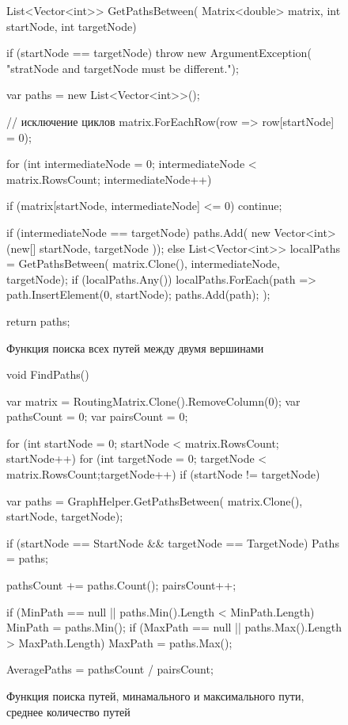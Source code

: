 \documentclass[oneside, final, 14pt, a4paper]{extreport}
\begin{document}
\begin{figure}[h!]
	\begin{listing}{1}
List<Vector<int>> GetPathsBetween(
  Matrix<double> matrix, int startNode, int targetNode)
{
  if (startNode == targetNode)
  throw new ArgumentException(
  "stratNode and targetNode must be different.");

  var paths = new List<Vector<int>>();

  // исключение циклов
  matrix.ForEachRow(row => row[startNode] = 0);

  for (int intermediateNode = 0;
  intermediateNode < matrix.RowsCount; intermediateNode++)
  {
	if (matrix[startNode, intermediateNode] <= 0)
	  continue;

	if (intermediateNode == targetNode)
	  paths.Add(
	  new Vector<int>(new[] { startNode, targetNode }));
	else
	{
	  List<Vector<int>> localPaths = GetPathsBetween(
	  matrix.Clone(), intermediateNode, targetNode);
	  if (localPaths.Any())
		localPaths.ForEach(path =>
	  	{
		  path.InsertElement(0, startNode);
		  paths.Add(path);
	  	});
	  }
    }

  return paths;
}\end{listing}

	\caption{Функция поиска всех путей между двумя вершинами}
	\label{pic:function_getPathsBetween}
\end{figure}

\begin{figure}[h!]
	\begin{listing}{1}
void FindPaths()
{
  var matrix = RoutingMatrix.Clone().RemoveColumn(0);
  var pathsCount = 0;
  var pairsCount = 0;

  for (int startNode = 0; startNode < matrix.RowsCount;
  	startNode++)
	for (int targetNode = 0;
	targetNode < matrix.RowsCount;targetNode++)
	  if (startNode != targetNode)
	  {	
		var paths = GraphHelper.GetPathsBetween(
		  matrix.Clone(), startNode, targetNode);

		if (startNode == StartNode
		  && targetNode == TargetNode)
		    Paths = paths;

		pathsCount += paths.Count();
		pairsCount++;							

		if (MinPath == null
		  || paths.Min().Length < MinPath.Length)
		    MinPath = paths.Min();
		if (MaxPath == null
		  || paths.Max().Length > MaxPath.Length)
		    MaxPath = paths.Max();
	  }

  AveragePaths = pathsCount / pairsCount;
}\end{listing}

	\caption{Функция поиска путей, минамального и максимального пути, среднее количество путей}
	\label{pic:function_findPaths}
\end{figure}
\end{document}
